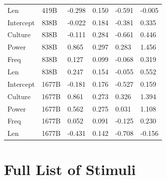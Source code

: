 \documentclass[
  12pt,
  letterpaper,
]{scrreport}
\begin{document}
\begin{longtable}[]{@{}llllll@{}}
Len & 419B & -0.298 & 0.150 & -0.591 & -0.005 \\
Intercept & 838B & -0.022 & 0.184 & -0.381 & 0.335 \\
Culture & 838B & -0.111 & 0.284 & -0.661 & 0.446 \\
Power & 838B & 0.865 & 0.297 & 0.283 & 1.456 \\
Freq & 838B & 0.127 & 0.099 & -0.068 & 0.319 \\
Len & 838B & 0.247 & 0.154 & -0.055 & 0.552 \\
Intercept & 1677B & -0.181 & 0.176 & -0.527 & 0.159 \\
Culture & 1677B & 0.861 & 0.273 & 0.326 & 1.394 \\
Power & 1677B & 0.562 & 0.275 & 0.031 & 1.108 \\
Freq & 1677B & 0.052 & 0.091 & -0.125 & 0.230 \\
Len & 1677B & -0.431 & 0.142 & -0.708 & -0.156 \\
\end{longtable}

\chapter{Full List of Stimuli}\label{sec-full-list-of-stimuli}

\tiny
\end{document}

